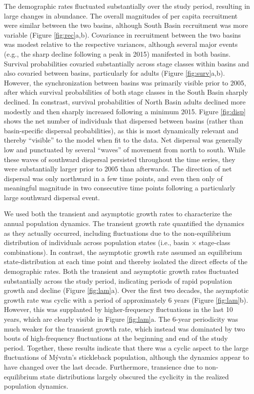 \documentclass[11pt]{article}
\begin{document}
The demographic rates fluctuated substantially over the study period,
resulting in large changes in abundance. 
The overall magnitudes of per capita recruitment were similar between the two basins,
although South Basin recruitment was more variable (Figure \ref{fig:rec}a,b).
Covariance in recruitment between the two basins was modest relative 
to the respective variances, 
although several major events (e.g., the sharp decline following a peak in 2015)
manifested in both basins.
Survival probabilities covaried substantially across stage classes within basins
and also covaried between basins, particularly for adults (Figure \ref{fig:surv}a,b).
However, the synchronization between basins was primarily visible prior to 2005, 
after which survival probabilities of both stage classes 
in the South Basin sharply declined.
In constrast, survival probabilities of North Basin adults declined more modestly 
and then sharply increased following a minimum 2015.
Figure \ref{fig:disp} shows the net number of individuals
that dispersed between basins (rather than basin-specific dispersal probabilities),
as this is most dynamically relevant and thereby ``visible'' to the model when fit to the data.
Net dispersal was generally low and punctuated by several ``waves'' of movement from 
north to south. 
While these waves of southward dispersal persisted throughout the time series,
they were substantially larger prior to 2005 than afterwards.
The direction of net dispersal was only northward in a few time points, 
and even then only of meaningful magnitude in two consecutive time points 
following a particularly large southward dispersal event.

We used both the transient and asymptotic growth rates 
to characterize the annual population dynamics.
The transient growth rate quantified the dynamics as they actually occurred,
including fluctuations due to the non-equilibrium distribution of individuals across 
population states (i.e., basin $\times$ stage-class combinations).
In contrast, the asymptotic growth rate assumed an equilibrium state-distribution 
at each time point and thereby isolated the direct effects of the demographic rates.
Both the transient and asymptotic growth rates fluctuated substantially 
across the study period, 
indicating periods of rapid population growth and decline (Figure \ref{fig:lam}a).
Over the first two decades, 
the asymptotic growth rate was cyclic with a period of approximately 6 years
(Figure \ref{fig:lam}b).
However, this was supplanted by higher-frequency fluctuations in the last 10 years,
which are clearly visible in Figure \ref{fig:lam}a.
The 6-year periodicity was much weaker for the transient growth rate,
which instead was dominated by two bouts of high-frequency fluctuations
at the beginning and end of the study period.
Together, these results indicate that there was a cyclic aspect to the large fluctuations 
of M\'{y}vatn's stickleback population, 
although the dynamics appear to have changed over the last decade.
Furthermore, transience due to non-equilibrium state distributions
largely obscured the cyclicity in the realized population dynamics.
\end{document}
